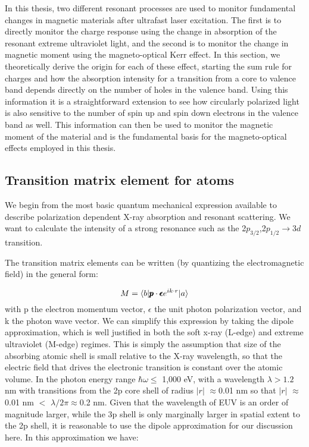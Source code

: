 In this thesis, two different resonant processes are used to monitor fundamental changes in magnetic materials after ultrafast laser excitation. The first is to directly monitor the charge response using the change in absorption of the resonant extreme ultraviolet light, and the second is to monitor the change in magnetic moment using the magneto-optical Kerr effect. In this section, we theoretically derive the origin for each of these effect, starting the sum rule for charges and how the absorption intensity for a transition from a core to valence band depends directly on the number of holes in the valence band. Using this information it is a straightforward extension to see how circularly polarized light is also sensitive to the number of spin up and spin down electrons in the valence band as well. This information can then be used to monitor the magnetic moment of the material and is the fundamental basis for the magneto-optical effects employed in this thesis.

\subsection{Transition matrix element for atoms}

We begin from the most basic quantum mechanical expression available to describe polarization dependent X-ray absorption and resonant scattering. We want to calculate the intensity of a strong resonance such as the 2$p_{3/2}$,2$p_{1/2}\rightarrow3d$ transition.

The transition matrix elements can be written (by quantizing the electromagnetic field) in the general form:

\begin{equation}
M = \braket{b| \pmb{p}\cdot \pmb{\epsilon} e^{ik\cdot r}|a}
\end{equation}
with p the electron momentum vector, $\epsilon$ the unit photon polarization vector, and k the photon wave vector. We can simplify this expression by taking the dipole approximation, which is well justified in both the soft x-ray (L-edge) and extreme ultraviolet (M-edge) regimes. This is simply the assumption that size of the absorbing atomic shell is small relative to the X-ray wavelength, so that the electric field that drives the electronic transition is constant over the atomic volume. In the photon energy range $\hbar\omega\leq$ 1,000 eV, with a wavelength $\lambda>1.2$ nm with transitions from the 2p core shell of radius $|r|$ $\approx$0.01 nm so that $|r|$ $\approx$0.01 nm $<$ $\lambda/2\pi\approx$0.2 nm. Given that the wavelength of EUV is an order of magnitude larger, while the 3p shell is only marginally larger in spatial extent to the 2p shell, it is reasonable to use the dipole approximation for our discussion here. In this approximation we have:

